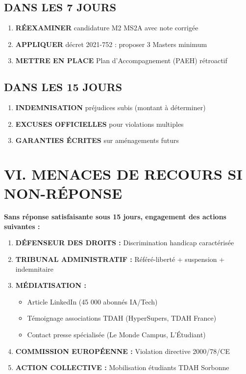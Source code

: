 \documentclass[12pt,french]{scrlttr2}
\begin{document}
\begin{letter}
\subsection*{\colorbox{orange!30}{\textbf{DANS LES 7 JOURS}}}

\begin{enumerate}[resume]
\item \textbf{RÉEXAMINER} candidature M2 MS2A avec note corrigée
\item \textbf{APPLIQUER} décret 2021-752 : proposer 3 Masters minimum
\item \textbf{METTRE EN PLACE} Plan d'Accompagnement (PAEH) rétroactif
\end{enumerate}

\subsection*{\colorbox{yellow!30}{\textbf{DANS LES 15 JOURS}}}

\begin{enumerate}[resume]
\item \textbf{INDEMNISATION} préjudices subis (montant à déterminer)
\item \textbf{EXCUSES OFFICIELLES} pour violations multiples
\item \textbf{GARANTIES ÉCRITES} sur aménagements futurs
\end{enumerate}

\section*{VI. MENACES DE RECOURS SI NON-RÉPONSE}

\textbf{Sans réponse satisfaisante sous 15 jours, engagement des actions suivantes :}

\begin{enumerate}
\item \textbf{DÉFENSEUR DES DROITS :} Discrimination handicap caractérisée
\item \textbf{TRIBUNAL ADMINISTRATIF :} Référé-liberté + suspension + indemnitaire
\item \textbf{MÉDIATISATION :}
   \begin{itemize}
   \item Article LinkedIn (45 000 abonnés IA/Tech)
   \item Témoignage associations TDAH (HyperSupers, TDAH France)
   \item Contact presse spécialisée (Le Monde Campus, L'Étudiant)
   \end{itemize}
\item \textbf{COMMISSION EUROPÉENNE :} Violation directive 2000/78/CE
\item \textbf{ACTION COLLECTIVE :} Mobilisation étudiants TDAH Sorbonne
\end{enumerate}


\end{letter}
\end{document}
